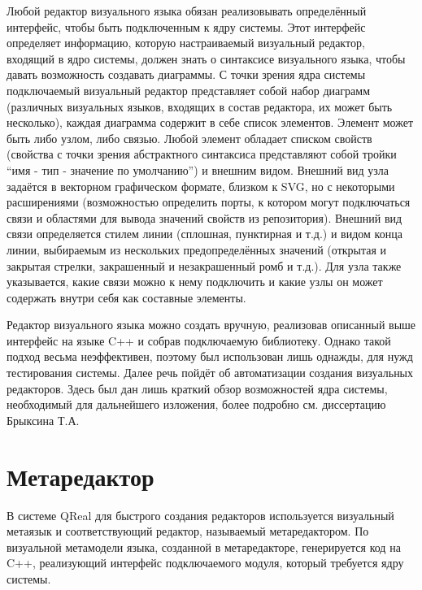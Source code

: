 Любой редактор визуального языка обязан реализовывать определённый интерфейс, чтобы 
быть подключенным к ядру системы. Этот интерфейс определяет информацию, которую настраиваемый 
визуальный редактор, входящий в ядро системы, должен знать о синтаксисе визуального 
языка, чтобы давать возможность создавать диаграммы. С точки зрения ядра системы подключаемый 
визуальный редактор представляет собой набор диаграмм (различных визуальных языков, 
входящих в состав редактора, их может быть несколько), каждая диаграмма содержит в 
себе список элементов. Элемент может быть либо узлом, либо связью. Любой элемент обладает 
списком свойств (свойства с точки зрения абстрактного синтаксиса представляют собой 
тройки "`имя - тип - значение по умолчанию"') и внешним видом. Внешний вид узла задаётся 
в векторном графическом формате, близком к SVG, но с некоторыми расширениями (возможностью 
определить порты, к котором могут подключаться связи и областями для вывода значений 
свойств из репозитория). Внешний вид связи определяется стилем линии (сплошная, пунктирная 
и т.д.) и видом конца линии, выбираемым из нескольких предопределённых значений (открытая 
и закрытая стрелки, закрашенный и незакрашенный ромб и т.д.). Для узла также указывается, 
какие связи можно к нему подключить и какие узлы он может содержать внутри себя как 
составные элементы.

Редактор визуального языка можно создать вручную, реализовав описанный выше интерфейс 
на языке C++ и собрав подключаемую библиотеку. Однако такой подход весьма неэффективен, 
поэтому был использован лишь однажды, для нужд тестирования системы. Далее речь пойдёт 
об автоматизации создания визуальных редакторов. Здесь был дан лишь краткий обзор 
возможностей ядра системы, необходимый для дальнейшего изложения, более подробно 
см. диссертацию Брыксина Т.А.

\section{Метаредактор}
В системе QReal для быстрого создания редакторов используется визуальный метаязык и 
соответствующий редактор, называемый метаредактором. По визуальной метамодели языка, 
созданной в метаредакторе, генерируется код на C++, реализующий интерфейс подключаемого 
модуля, который требуется ядру системы.

